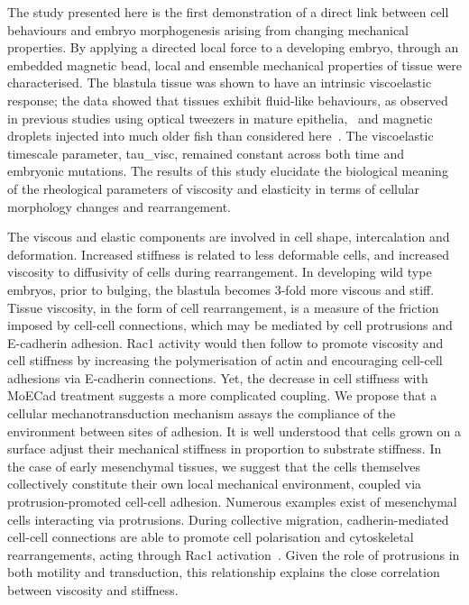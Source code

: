 The study presented here is the first demonstration of a direct link between cell behaviours and embryo morphogenesis arising from changing mechanical properties.
By applying a directed local force to a developing embryo, through an embedded magnetic bead, local and ensemble mechanical properties of tissue were characterised.
The blastula tissue was shown to have an intrinsic viscoelastic response;
the data showed that tissues exhibit fluid-like behaviours, as observed in previous studies using optical tweezers in mature epithelia,~\cite{bambardekarDirectLaserManipulation2015} and magnetic droplets injected into much older fish than considered here~\cite{serwaneVivoQuantificationSpatially2017}.
The viscoelastic timescale parameter, \gls{tau_visc}, remained constant across both time and embryonic mutations.
The results of this study elucidate the biological meaning of the rheological parameters of viscosity and elasticity in terms of cellular morphology changes and rearrangement.

The viscous and elastic components are involved in cell shape, intercalation and deformation.
Increased stiffness is related to less deformable cells, and increased viscosity to diffusivity of cells during rearrangement.
In developing wild type embryos, prior to bulging, the blastula becomes 3-fold more viscous and stiff.
Tissue viscosity, in the form of cell rearrangement, is a measure of the friction imposed by cell-cell connections, which may be mediated by cell protrusions and
E-cadherin adhesion.
\gls{Rac1} activity would then follow to promote viscosity and cell stiffness by increasing the polymerisation of actin and encouraging cell-cell adhesions via E-cadherin connections.
Yet, the decrease in cell stiffness with MoECad treatment suggests a more complicated coupling. %
We propose that a cellular mechanotransduction mechanism assays the compliance of the environment between sites of adhesion.
It is well understood that cells grown on a surface adjust their mechanical stiffness in proportion to substrate stiffness. %
In the case of early mesenchymal tissues, we suggest that the cells themselves collectively constitute their own local mechanical environment, coupled via protrusion-promoted cell-cell adhesion.
Numerous examples exist of mesenchymal cells interacting via protrusions.
During collective migration, cadherin-mediated cell-cell connections are able to promote cell polarisation and cytoskeletal rearrangements, acting through \gls{Rac1} activation~\cite{caiMechanicalFeedbackEcadherin2014}.
Given the role of protrusions in both motility and transduction, this relationship explains the close correlation between viscosity and stiffness.

